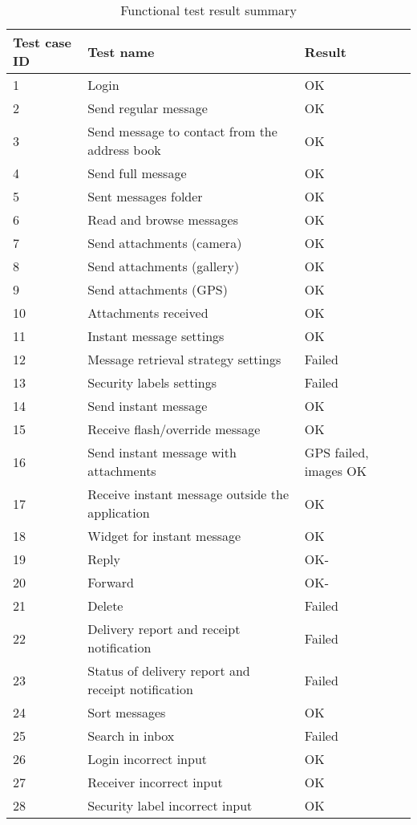 \begin{table}[h!]
\begin{center}
					\begin{tabular}{l|l|l}\hline
						\textbf{Test case ID} & \textbf{Test name} & \textbf{Result} \\ \hline \hline
						1&Login&OK\\
						2&Send regular message&OK\\
						3&Send message to contact from the address book&OK\\
						4&Send full message&OK\\
						5&Sent messages folder&OK\\
						6&Read and browse messages&OK\\
						7&Send attachments (camera)&OK\\
						8&Send attachments (gallery)&OK\\
						9&Send attachments (GPS)&OK\\
						10&Attachments received&OK\\
						11&Instant message settings&OK\\
						12&Message retrieval strategy settings&Failed\\
						13&Security labels settings&Failed\\
						14&Send instant message&OK\\
						15&Receive flash/override message&OK\\
						16&Send instant message with attachments&GPS failed, images OK\\
						17&Receive instant message outside the application&OK\\
						18&Widget for instant message&OK\\
						19&Reply&OK-\\
						20&Forward&OK-\\
						21&Delete&Failed\\
						22&Delivery report and receipt notification&Failed\\
						23&Status of delivery report and receipt notification&Failed\\
						24&Sort messages&OK\\
						25&Search in inbox&Failed\\	
						26&Login incorrect input&OK\\
						27&Receiver incorrect input&OK\\
						28&Security label incorrect input&OK\\ \hline
					\end{tabular}
\end{center}
\caption{Functional test result summary} \label{tab:caseresults}
\end{table}

